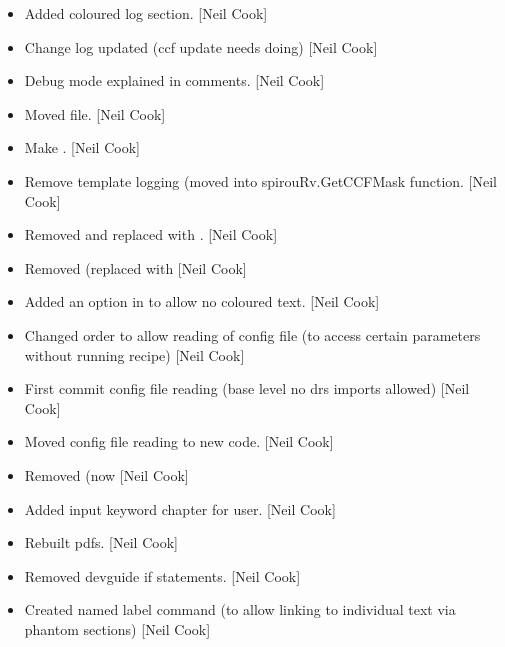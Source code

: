 \documentclass[a4paper,10pt,english]{report}
\begin{document}
\begin{itemize}
\item {} 
Added coloured log section. {[}Neil Cook{]}

\item {} 
Change log updated (ccf update needs doing) {[}Neil Cook{]}

\item {} 
Debug mode explained in comments. {[}Neil Cook{]}

\item {} 
Moved file. {[}Neil Cook{]}

\item {} 
Make  . {[}Neil Cook{]}

\item {} 
Remove template logging (moved into spirouRv.GetCCFMask function.
{[}Neil Cook{]}

\item {} 
Removed  and replaced with . {[}Neil Cook{]}

\item {} 
Removed  (replaced with  {[}Neil Cook{]}

\item {} 
Added an option in  to allow no coloured text. {[}Neil Cook{]}

\item {} 
Changed order to allow reading of config file (to access certain
parameters without running recipe) {[}Neil Cook{]}

\item {} 
First commit \sphinxhyphen{} config file reading (base level no drs imports allowed)
{[}Neil Cook{]}

\item {} 
Moved config file reading to new code. {[}Neil Cook{]}

\item {} 
Removed  (now  {[}Neil Cook{]}

\item {} 
Added input keyword chapter for user. {[}Neil Cook{]}

\item {} 
Rebuilt pdfs. {[}Neil Cook{]}

\item {} 
Removed devguide if statements. {[}Neil Cook{]}

\item {} 
Created named label command (to allow linking to individual text via
phantom sections) {[}Neil Cook{]}


\end{itemize}
\end{document}
